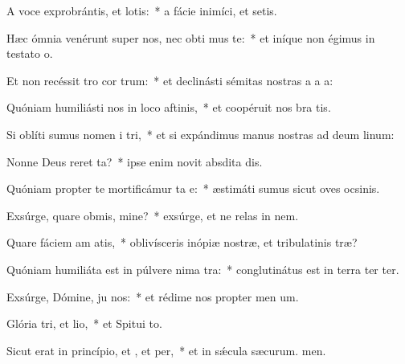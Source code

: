 \item A voce exprobrántis, et lotis:~* a fácie inimíci, et setis.
\item Hæc ómnia venérunt super nos, nec obti mus te:~* et iníque non égimus in testato o.
\item Et non recéssit tro cor trum:~* et declinásti sémitas nostras a a a:
\item Quóniam humiliásti nos in loco aftinis,~* et coopéruit nos bra tis.
\item Si oblíti sumus nomen i tri,~* et si expándimus manus nostras ad deum linum:
\item Nonne Deus reret ta?~* ipse enim novit absdita dis.
\item Quóniam propter te mortificámur ta e:~* æstimáti sumus sicut oves ocsinis.
\item Exsúrge, quare obmis, mine?~* exsúrge, et ne relas in nem.
\item Quare fáciem am atis,~* oblivísceris inópiæ nostræ, et tribulatinis træ?
\item Quóniam humiliáta est in púlvere nima tra:~* conglutinátus est in terra ter ter.
\item Exsúrge, Dómine, ju nos:~* et rédime nos propter men um.
\item Glória tri, et lio,~* et Spitui to.
\item Sicut erat in princípio, et , et per,~* et in sǽcula sæcurum. men.
